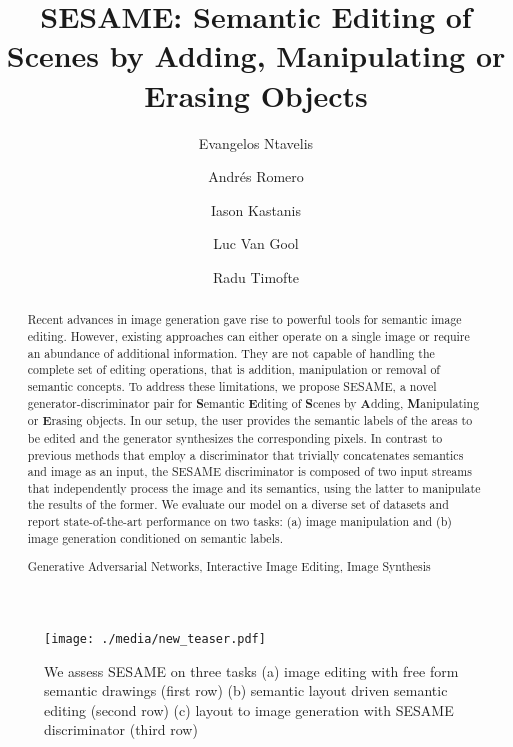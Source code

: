 \documentclass[runningheads]{llncs}
\begin{document}
\pagestyle{headings}
\mainmatter
\def\ECCVSubNumber{4076}  



\title{SESAME: Semantic Editing of Scenes by Adding, Manipulating or Erasing Objects} 

\author{Evangelos Ntavelis \and
Andr\'es Romero \and
Iason Kastanis \and
Luc Van Gool \and
Radu Timofte}

\maketitle

\begin{figure}
\centering
    \texttt{[image: ./media/new\_teaser.pdf]}
\caption{We assess SESAME on three tasks (a) image editing with free form semantic drawings (first row) (b) semantic layout driven semantic editing (second row) (c) layout to image generation with SESAME discriminator (third row)}
    \label{fig:teaser}
\end{figure}

\begin{abstract}
Recent advances in image generation gave rise to powerful tools for semantic image editing. However, existing approaches can either operate on a single image or require an abundance of additional information. They are not capable of handling the complete set of editing operations, that is addition, manipulation or removal of semantic concepts.
To address these limitations, 
we propose SESAME, a novel generator-discriminator pair for \textbf{S}emantic \textbf{E}diting of \textbf{S}cenes by \textbf{A}dding, \textbf{M}anipulating or \textbf{E}rasing objects.
In our setup, the user provides the semantic labels of the areas to be edited and the generator synthesizes the corresponding pixels.
In contrast to previous methods that employ a discriminator that trivially concatenates semantics and image as an input, the SESAME discriminator is composed of two input streams that independently process the image and its semantics, using the latter to manipulate the results of the former.
We evaluate our model on a diverse set of datasets and report state-of-the-art performance on two tasks: (a) image manipulation and (b) image generation conditioned on semantic labels.

\keywords Generative Adversarial Networks, Interactive Image Editing, Image Synthesis 
\end{abstract}
\end{document}
